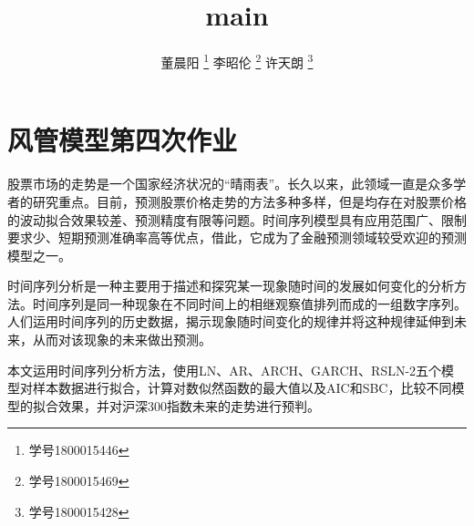 \documentclass[11pt]{article}
\author{
董晨阳 \thanks{学号1800015446}
李昭伦 \thanks{学号1800015469}
许天朗 \thanks{学号1800015428}
}
\title{main}
\begin{document}
    \maketitle




    \hypertarget{ux98ceux7ba1ux6a21ux578bux7b2cux56dbux6b21ux4f5cux4e1a}{%
\section{风管模型第四次作业}\label{ux98ceux7ba1ux6a21ux578bux7b2cux56dbux6b21ux4f5cux4e1a}}

股票市场的走势是一个国家经济状况的``晴雨表''。长久以来，此领域一直是众多学者的研究重点。目前，预测股票价格走势的方法多种多样，但是均存在对股票价格的波动拟合效果较差、预测精度有限等问题。时间序列模型具有应用范围广、限制要求少、短期预测准确率高等优点，借此，它成为了金融预测领域较受欢迎的预测模型之一。

时间序列分析是一种主要用于描述和探究某一现象随时间的发展如何变化的分析方法。时间序列是同一种现象在不同时间上的相继观察值排列而成的一组数字序列。人们运用时间序列的历史数据，揭示现象随时间变化的规律并将这种规律延伸到未来，从而对该现象的未来做出预测。

本文运用时间序列分析方法，使用LN、AR、ARCH、GARCH、RSLN-2五个模型对样本数据进行拟合，计算对数似然函数的最大值以及AIC和SBC，比较不同模型的拟合效果，并对沪深300指数未来的走势进行预判。
\end{document}
